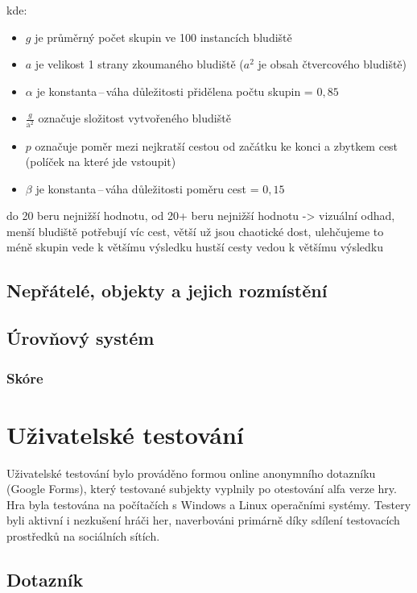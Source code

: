 kde: 
\begin{itemize}
    \item $g$ je průměrný počet skupin ve 100 instancích bludiště
    \item $a$ je velikost 1 strany zkoumaného bludiště ($a^2$ je obsah čtvercového bludiště)
    \item $\alpha$ je konstanta\,--\,váha důležitosti přidělena počtu skupin = $0,85$
    \item $\frac{g}{\text{a}^2}$ označuje složitost vytvořeného bludiště
    \item $p$ označuje poměr mezi nejkratší cestou od začátku ke konci a zbytkem cest (políček na které jde vstoupit)
    \item $\beta$ je konstanta\,--\,váha důležitosti poměru cest = $0,15$
\end{itemize}
do 20 beru nejnižší hodnotu, od 20+ beru nejnižší hodnotu -> vizuální odhad, menší bludiště potřebují víc cest, větší už jsou chaotické dost, ulehčujeme to
 méně skupin vede k většímu výsledku
  hustší cesty vedou k většímu výsledku
\newpage
\section{Nepřátelé, objekty a jejich rozmístění}

\section{Úrovňový systém}

\subsection*{Skóre}

\chapter{Uživatelské testování}
Uživatelské testování bylo prováděno formou online anonymního dotazníku (Google Forms), který testované subjekty vyplnily po otestování alfa verze hry. Hra byla testována na počítačích s Windows a Linux operačními systémy. Testery byli aktivní i nezkušení hráči her, naverbováni primárně díky sdílení testovacích prostředků na sociálních sítích.
\section{Dotazník}

